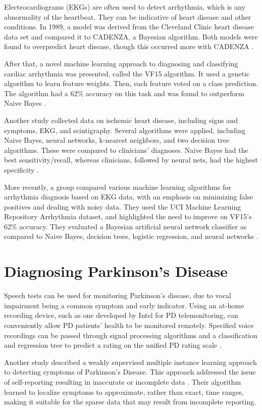 \documentclass[draftcopy]{srpaper}
\begin{document}
Electrocardiograms (EKGs) are often used to detect arrhythmia, which is any
abnormality of the heartbeat. They can be indicative of heart disease
and other conditions. In 1989, a model was derived from the Cleveland Clinic heart disease data set and
compared it to CADENZA, a Bayesian algorithm. Both models were found
to overpredict heart disease, though this occurred more with CADENZA
\cite{Det89}. 

After that, a novel machine learning approach to diagnosing and
classifying cardiac arrhythmia was presented, called the VF15
algorithm. It used a genetic algorithm to learn feature weights. Then,
each feature voted on a class prediction. The algorithm had a 62\%
accuracy on this task and was found to outperform Naive Bayes \cite{GAD98}.

Another study collected data on ischemic heart disease, including signs and
symptoms, EKG, and scintigraphy. Several algorithms were applied, including Naive Bayes, neural networks,
k-nearest neighbors, and two decision tree algorithms. These were compared to clinicians’ diagnoses. Naive Bayes had the best
sensitivity/recall, whereas clinicians, followed by neural nets, had
the highest specificity \cite{KKG+99}.

More recently, a group compared various machine learning algorithms for arrhythmia
diagnosis based on EKG data, with an emphasis on minimizing false
positives and dealing with noisy data. They used the UCI Machine
Learning Repository Arrhythmia dataset, and highlighted the need to
improve on VF15’s 62\% accuracy. They evaluated a Bayesian artificial neural network classifier as compared to Naive Bayes, decision trees, logistic regression, and neural networks \cite{GMCL05}.

\section{Diagnosing Parkinson's Disease}
Speech tests can be used for monitoring Parkinson’s disease, due to
vocal impairment being a common symptom and early indicator. Using an
at-home recording device, such as one developed by Intel for PD
telemonitoring, can conveniently allow PD patients' health to be monitored
remotely. Specified voice recordings can be passed through signal processing algorithms and a
classification and regression tree to predict a rating on the unified
PD rating scale \cite{TLMR10}.

Another study described a weakly supervised multiple instance learning
approach to detecting symptoms of Parkinson’s Disease. This approach
addressed the issue of self-reporting resulting in inaccurate or
incomplete data \cite{DAlTH12}. Their algorithm learned to localize
symptoms to approximate, rather than exact, time ranges, making it
suitable for the sparse data that may result from incomplete reporting.
\end{document}
